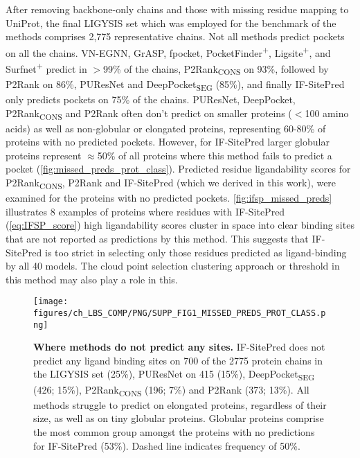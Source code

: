 After removing backbone-only chains and those with missing residue mapping to UniProt, the final LIGYSIS set which was employed for the benchmark of the methods comprises 2,775 representative chains. Not all methods predict pockets on all the chains. VN-EGNN, GrASP, fpocket, PocketFinder\textsuperscript{+}, Ligsite\textsuperscript{+}, and Surfnet\textsuperscript{+} predict in $>$99\% of the chains, P2Rank\textsubscript{CONS} on 93\%, followed by P2Rank on 86\%, PUResNet and DeepPocket\textsubscript{SEG} (85\%), and finally IF-SitePred only predicts pockets on 75\% of the chains. PUResNet, DeepPocket, P2Rank\textsubscript{CONS} and P2Rank often don't predict on smaller proteins ($<$100 amino acids) as well as non-globular or elongated proteins, representing 60-80\% of proteins with no predicted pockets. However, for IF-SitePred larger globular proteins represent $\approx$50\% of all proteins where this method fails to predict a pocket (\autoref{fig:missed_preds_prot_class}). Predicted residue ligandability scores for P2Rank\textsubscript{CONS}, P2Rank and IF-SitePred (which we derived in this work), were examined for the proteins with no predicted pockets. \autoref{fig:ifsp_missed_preds} illustrates 8 examples of proteins where residues with IF-SitePred (\autoref{eq:IFSP_score}) high ligandability scores cluster in space into clear binding sites that are not reported as predictions by this method. This suggests that IF-SitePred is too strict in selecting only those residues predicted as ligand-binding by all 40 models. The cloud point selection clustering approach or threshold in this method may also play a role in this.

\begin{figure}[ht!]
    \centering
    \texttt{[image: figures/ch\_LBS\_COMP/PNG/SUPP\_FIG1\_MISSED\_PREDS\_PROT\_CLASS.png]}
    \caption[Where methods do not predict any sites]{\textbf{Where methods do not predict any sites.} IF-SitePred does not predict any ligand binding sites on 700 of the 2775 protein chains in the LIGYSIS set (25\%), PUResNet on 415 (15\%), DeepPocket\textsubscript{SEG} (426; 15\%), P2Rank\textsubscript{CONS} (196; 7\%) and P2Rank (373; 13\%). All methods struggle to predict on elongated proteins, regardless of their size, as well as on tiny globular proteins. Globular proteins comprise the most common group amongst the proteins with no predictions for IF-SitePred (53\%). Dashed line indicates frequency of 50\%.}
    \label{fig:missed_preds_prot_class}
\end{figure}

